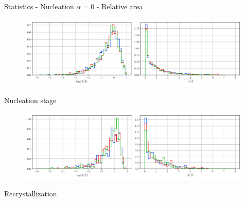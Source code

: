 \documentclass[usenames,dvipsnames]{beamer}
\begin{document}
\begin{frame}{Statistics - Nucleation $\alpha = 0$ - Relative area}
\small
\centering
    \vspace{-0.5em}
    \begin{figure}
        \centering
        \includegraphics[scale=0.35]{figures/stored_energy/SE/areas/000110_nuclconstant_set.pdf}
    \end{figure}
    \vspace{-1em}
    Nucleation stage
    \begin{figure}
        \centering
        \includegraphics[scale=0.35]{figures/stored_energy/SE/areas/000240_nuclconstant_set.pdf}
    \end{figure}
    \vspace{-1em}
    Recrystallization
\end{frame}
\end{document}
